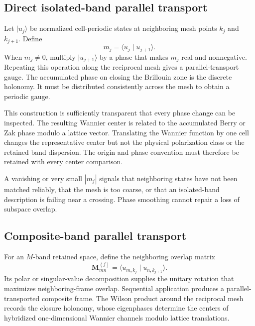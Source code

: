 \subsection*{Direct isolated-band parallel transport}

Let $\lvert u_j\rangle$ be normalized cell-periodic states at neighboring mesh
points $k_j$ and $k_{j+1}$. Define
\begin{equation}
    m_j
    =
    \langle u_j\mid u_{j+1}\rangle.
\end{equation}
When $m_j\neq0$, multiply $\lvert u_{j+1}\rangle$ by a phase that makes $m_j$
real and nonnegative. Repeating this operation along the reciprocal mesh gives
a parallel-transport gauge. The accumulated phase on closing the Brillouin
zone is the discrete holonomy. It must be distributed consistently across the
mesh to obtain a periodic gauge.

This construction is sufficiently transparent that every phase change can be
inspected. The resulting Wannier center is related to the accumulated Berry or
Zak phase modulo a lattice vector. Translating the Wannier function by one cell
changes the representative center but not the physical polarization class or
the retained band dispersion. The origin and phase convention must therefore
be retained with every center comparison.

A vanishing or very small $|m_j|$ signals that neighboring states have not been
matched reliably, that the mesh is too coarse, or that an isolated-band
description is failing near a crossing. Phase smoothing cannot repair a loss of
subspace overlap.

\subsection*{Composite-band parallel transport}

For an $M$-band retained space, define the neighboring overlap matrix
\begin{equation}
    \mathbf M^{(j)}_{mn}
    =
    \langle u_{m,k_j}\mid u_{n,k_{j+1}}\rangle.
\end{equation}
Its polar or singular-value decomposition supplies the unitary rotation that
maximizes neighboring-frame overlap. Sequential application produces a
parallel-transported composite frame. The Wilson product around the reciprocal
mesh records the closure holonomy, whose eigenphases determine the centers of
hybridized one-dimensional Wannier channels modulo lattice translations.

